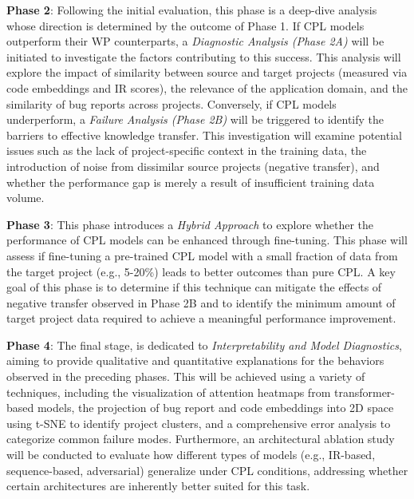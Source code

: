 \documentclass[12pt,table,xcdraw]{article}
\begin{document}
\textbf{Phase 2}: Following the initial evaluation, this phase is a deep-dive analysis whose direction is determined by the outcome of Phase 1. If CPL models outperform their WP counterparts, a \textit{Diagnostic Analysis (Phase 2A)} will be initiated to investigate the factors contributing to this success. This analysis will explore the impact of similarity between source and target projects (measured via code embeddings and IR scores), the relevance of the application domain, and the similarity of bug reports across projects. Conversely, if CPL models underperform, a \textit{Failure Analysis (Phase 2B)} will be triggered to identify the barriers to effective knowledge transfer. This investigation will examine potential issues such as the lack of project-specific context in the training data, the introduction of noise from dissimilar source projects (negative transfer), and whether the performance gap is merely a result of insufficient training data volume.

\textbf{Phase 3}: This phase introduces a \textit{Hybrid Approach} to explore whether the performance of CPL models can be enhanced through fine-tuning. This phase will assess if fine-tuning a pre-trained CPL model with a small fraction of data from the target project (e.g., 5-20\%) leads to better outcomes than pure CPL. A key goal of this phase is to determine if this technique can mitigate the effects of negative transfer observed in Phase 2B and to identify the minimum amount of target project data required to achieve a meaningful performance improvement.

\textbf{Phase 4}: The final stage, is dedicated to \textit{Interpretability and Model Diagnostics}, aiming to provide qualitative and quantitative explanations for the behaviors observed in the preceding phases. This will be achieved using a variety of techniques, including the visualization of attention heatmaps from transformer-based models, the projection of bug report and code embeddings into 2D space using t-SNE to identify project clusters, and a comprehensive error analysis to categorize common failure modes. Furthermore, an architectural ablation study will be conducted to evaluate how different types of models (e.g., IR-based, sequence-based, adversarial) generalize under CPL conditions, addressing whether certain architectures are inherently better suited for this task.
\end{document}
